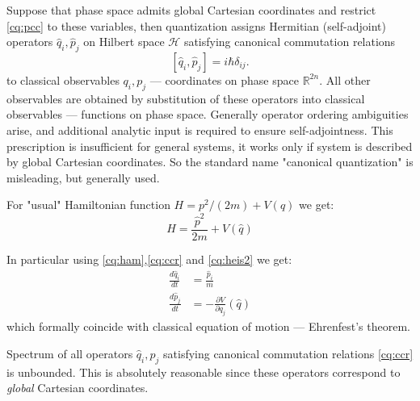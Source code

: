 Suppose that phase space admits global Cartesian coordinates 
and restrict \eqref{cq:pcc} to these variables, 
then quantization assigns Hermitian (self-adjoint) operators
$\hat q_i, \hat p_j$ on Hilbert space $ \mathcal{H} $
satisfying canonical commutation relations
\begin{equation}
    \label{cq:ccr}
    [\hat q_i, \hat p_j] = i\hbar \delta_{ij}.
\end{equation}
to classical observables $q_i, p_j$ --- coordinates on phase space $ \mathbb{R}^{2 n} $.
All other observables are obtained by substitution of these operators into
classical observables --- functions on phase space.
Generally operator ordering ambiguities arise,  
and additional analytic input is required to ensure self-adjointness.
This prescription is insufficient for general systems, it works only
if system is described by global Cartesian coordinates.
So the standard name "canonical quantization" is misleading, but generally used.

For "usual" Hamiltonian function $ H=p^2/(2 m) +V(q) $ we get:
\begin{equation}
   \label {cq:ham}
    \hat H = \frac{\hat p^2}{2 m}+V(\hat q)
\end{equation}

In particular using \eqref{cq:ham},\eqref{cq:ccr} and \eqref{cq:heis2} we get:
\begin{equation}
   \label {cq:ehrenfest}
   \begin{split}
       \frac{d \hat q_i}{d t} &= \frac{\hat p_i}{m}\\
       \frac{d \hat p_j}{d t} &= - \frac{\partial V}{\partial q_j}(\hat q)
   \end{split}
\end{equation}
which formally coincide with classical equation of motion
--- Ehrenfest's theorem.
\begin{remark}
    Spectrum of all operators $ \hat q_i, \hat p_j$ satisfying
    canonical commutation relations \eqref{cq:ccr} is unbounded.
    This is absolutely reasonable since these operators 
    correspond to \emph{global} Cartesian coordinates.
\end{remark}  
